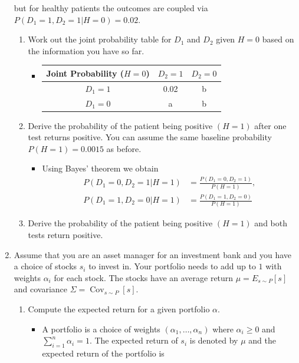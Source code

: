 \documentclass{article}
\begin{document}
\begin{enumerate}
$$	$$
	but for healthy patients the outcomes are coupled via $P(D_1 = 1, D_2 = 1| H = 0) = 0.02$.
	\begin{enumerate}
		\item Work out the joint probability table for $D_1$ and $D_2$ given $H = 0$ based on the information you have so far.
			\begin{itemize}
				\item
					\begin{center}
						\begin{tabular}{|c|c|c|} \hline
						Joint Probability ($H = 0$) & $D_2 = 1$ & $D_2 = 0$ \\ \hline
						$D_1 = 1$ & 0.02 & b \\ \hline
						$D_1 = 0$ & a & b \\ \hline
						\end{tabular}
					\end{center}
			\end{itemize}
		\item Derive the probability of the patient being positive $(H = 1)$ after one test returns positive. You can assume the same baseline probability $P(H = 1) = 0.0015$ as before.
			\begin{itemize}
				\item Using Bayes' theorem we obtain
				$$
				\begin{aligned}
				P(D_1 = 0, D_2 = 1 | H = 1) &= \frac{P(D_1 = 0, D_2 = 1)}{P(H = 1)}, \\
				P(D_1 = 1, D_2 = 0 | H = 1) &= \frac{P(D_1 = 1, D_2 = 0)}{P(H = 1)}
				\end{aligned}
				$$
			\end{itemize}
		\item Derive the probability of the patient being positive $(H = 1)$ and both tests return positive.
	\end{enumerate}
	\item Assume that you are an asset manager for an investment bank and you have a choice of stocks $s_i$ to invest in. Your portfolio needs to add up to $1$ with weights $\alpha_i$ for each stock. The stocks have an average return $\mu = E_{s \sim P}[s]$ and covariance $\Sigma = \operatorname{Cov}_{s \sim P}[s]$.
		\begin{enumerate}
			\item Compute the expected return for a given portfolio $\alpha$.
				\begin{itemize}
					\item A portfolio is a choice of weights $(\alpha_1, \dots, \alpha_n)$ where $\alpha_i \geq 0$ and $\sum_{i = 1}^n \alpha_i = 1$. The expected return of $s_i$ is denoted by $\mu$ and the expected return of the portfolio is

\end{itemize}
\end{enumerate}
\end{enumerate}
\end{document}
